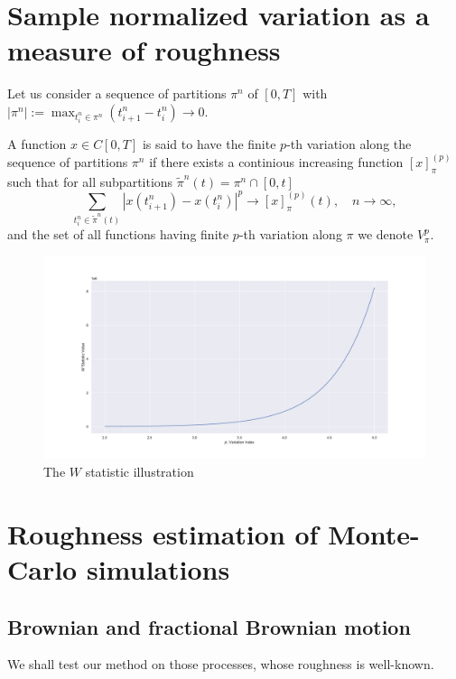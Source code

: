 \section{Sample normalized variation as a measure of roughness}
    Let us consider a sequence of partitions $\pi^n$ of $\left[0, T\right]$ with 
    $\left|\pi^n\right|:=\max_{t_i^n \in \pi^n} (t_{i+1}^n - t_i^n) \to 0$. 
    \begin{definition}
        A function $x \in C[0, T]$ is said to have the finite $p$-th variation along the sequence of partitions $\pi^n$ 
        if there exists a continious increasing function $\left[x\right]_{\pi}^{(p)}$ such that for all subpartitions $\tilde\pi^n(t) = \pi^n \cap [0, t]$
        \begin{equation}
            \sum_{t_i^n \in \tilde\pi^n(t)} \left|x(t_{i+1}^n) - x(t_i^n)\right|^p \to \left[x\right]_{\pi}^{(p)}(t), \quad n\to \infty,
        \end{equation}
        and the set of all functions having finite $p$-th variation along $\pi$ we denote $V_\pi^p$.
    \end{definition}


    \begin{figure}
        \centering
        \includegraphics[width=\linewidth]{fig/W Stat Illustration.pdf}
        \caption{The $W$ statistic illustration}
    \end{figure}

\section{Roughness estimation of Monte-Carlo simulations}

    \subsection{Brownian and fractional Brownian motion}
        We shall test our method on those processes, whose roughness is well-known.

